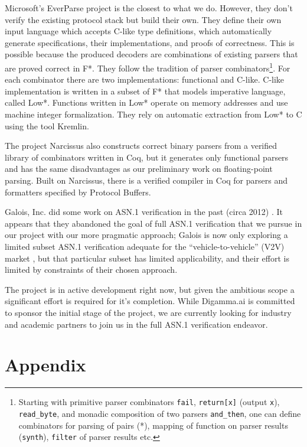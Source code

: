 \documentclass[10p,conference]{IEEEtran}
\begin{document}
Microsoft's EverParse project \cite{RamananandroDFS19} is the closest
to what we do. However, they don't verify the existing protocol stack but
build their own. They define their own input language which accepts
C-like type definitions, which automatically generate specifications, their implementations, and proofs of correctness. This is possible because the produced decoders are combinations of existing parsers that are proved correct in F*. They
follow the tradition of parser combinators\footnote{Starting with
  primitive parser combinators \texttt{fail}, \texttt{return[x]}
  (output \texttt{x}), \texttt{read\_byte}, and monadic composition of
  two parsers \texttt{and\_then}, one can define combinators for
  parsing of pairs (*), mapping of function on parser results
  (\texttt{synth}), \texttt{filter} of parser results etc.}. For each
combinator there are two implementations: functional and
C-like. C-like implementation is written in a subset of F* that models
imperative language, called Low*. Functions written in Low* operate on
memory addresses and use machine integer formalization. They rely on
automatic extraction from Low* to C using the tool Kremlin.

The project Narcissus \cite{Narcissus} also constructs correct binary parsers from a verified
library of combinators written in Coq, but it generates only functional
parsers and has the same disadvantages as our preliminary work on floating-point parsing. Built on Narcissus, there is a verified compiler in Coq for
parsers and formatters specified by Protocol Buffers.
 
Galois, Inc. did some work on ASN.1 verification in the past (circa
2012) \cite{ASN1FormalSem}. It appears that they abandoned the goal of
full ASN.1 verification \cite{ASN1EncDec} that we pursue in our
project with our more pragmatic approach; Galois is now only exploring
a limited subset ASN.1 verification adequate for the
``vehicle-to-vehicle'' (V2V) market \cite{V2V}, but that particular
subset has limited applicability, and their effort is limited by
constraints of their chosen approach.

The project is in active development right now, but given the
ambitious scope a significant effort is required for it's completion.
While Digamma.ai is committed to sponsor the initial stage of the
project, we are currently looking for industry and academic partners
to join us in the full ASN.1 verification endeavor.

 \onecolumn
\section*{Appendix}
\end{document}
